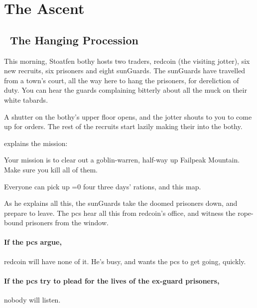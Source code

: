 \section{The Ascent}

\begin{multicols}{2}


\subsection[The Hanging Procession]{~The Hanging Procession~}

\begin{boxtext}
  This morning, Stoatfen \gls{bothy} hosts two traders, \gls{redcoin} (the visiting \gls{jotter}), six new recruits, six prisoners and eight \glspl{sunGuard}.
  The \glspl{sunGuard} have travelled from a town's \gls{court}, all the way here to hang the prisoners, for dereliction of duty.
  You can hear the guards complaining bitterly about all the muck on their white tabards.

  A shutter on the \gls{bothy}'s upper floor opens, and the \gls{jotter} shouts to you to come up for orders.
  The rest of the recruits start lazily making their into the \gls{bothy}.
\end{boxtext}

 explains the mission:

\begin{exampletext}
  Your mission is to clear out a goblin-warren, half-way up Failpeak Mountain.
  Make sure you kill all of them.

  Everyone can pick up \ifnum\value{temperature}=0 four \else three \fi days' rations, and this map.
\end{exampletext}

\noindent
As he explains all this, the \glspl{sunGuard} take the doomed prisoners down, and prepare to leave.
The \glspl{pc} hear all this from \gls{redcoin}'s office, and witness the rope-bound prisoners from the window.


\paragraph{If the \glspl{pc} argue,}
\gls{redcoin} will have none of it.
He's busy, and wants the \glspl{pc} to get going, quickly.

\paragraph{If the \glspl{pc} try to plead for the lives of the ex-\gls{guard} prisoners,}
nobody will listen.


\end{multicols}
